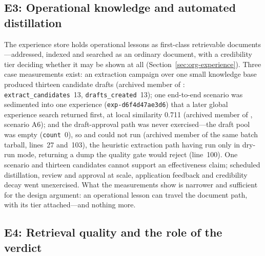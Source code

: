\subsection{E3: Operational knowledge and automated distillation}
\label{sec:e3}

The experience store holds operational lessons as first-class retrievable
documents---addressed, indexed and searched as an ordinary document, with a
credibility tier deciding whether it may be shown at all
(Section~\ref{sec:org-experience}). Three case measurements exist: an
extraction campaign over one small knowledge base produced thirteen
candidate drafts
(archived member  of
:
\texttt{extract\_candidates}~13, \texttt{drafts\_created}~13); one
end-to-end scenario was sedimented into one experience
(\texttt{exp-d6f4d47ae3d6}) that a later global experience search returned
first, at local similarity 0.711 (archived member 
of ,
scenario A6); and the draft-approval path was never exercised---the draft pool was
empty (\texttt{count}~0), so  and
 could not run
(archived member  of the same batch tarball,
lines~27 and~103),
the heuristic extraction path having run only in dry-run mode, returning a
dump the quality gate would reject (line~100). One scenario and thirteen
candidates cannot support an effectiveness claim;
scheduled distillation, review and approval at scale, application feedback
and credibility decay went unexercised. What the measurements show is
narrower and sufficient for the design argument: an operational lesson can
travel the document path, with its tier attached---and nothing more.

\subsection{E4: Retrieval quality and the role of the verdict}
\label{sec:e4}
\label{sec:eval-retrieval}

